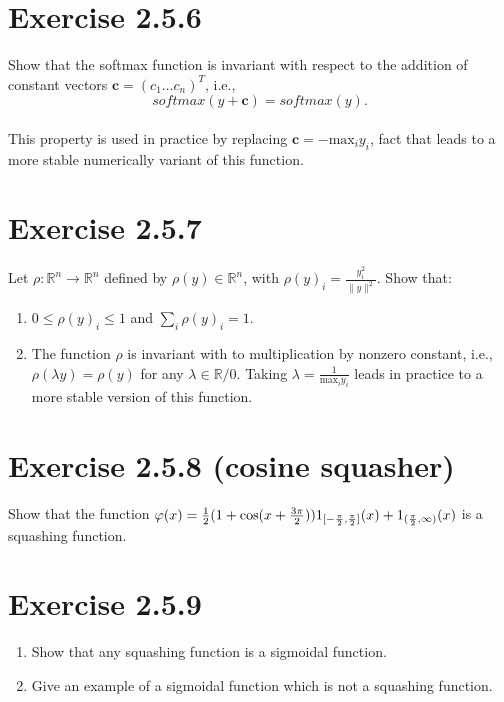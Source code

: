 \documentclass{exam}
\begin{document}
\section*{Exercise 2.5.6}
Show that the softmax function is invariant with respect to the addition of constant vectors $\pmb{c} = (c_1 \ldots c_n)^{T}$, i.e., \\
\begin{equation*}
    softmax(y + \pmb{c}) = softmax(y).
\end{equation*}\\
This property is used in practice by replacing $\pmb{c} = - \text{max}_i y_i$, fact that leads to a more stable numerically variant of this function.

\section*{Exercise 2.5.7}
Let $\rho: \mathbb{R}^n \rightarrow \mathbb{R}^n$ defined by $\rho(y) \in \mathbb{R}^n$, with $\rho(y)_i = \displaystyle\frac{y^2_i}{\lVert y \rVert^{2} }$. Show that: 
\begin{enumerate}
    \item $0 \leq \rho(y)_i \leq 1$ and $\sum_i \rho(y)_i = 1$.
    \item The function $\rho$ is invariant with to multiplication by nonzero constant, i.e., $\rho(\lambda y ) = \rho(y)$ for any $\lambda \in \mathbb{R}/{0}$. Taking $\lambda = \frac{1}{\text{max}_i y_i}$ leads in practice to a more stable version of this function. 
\end{enumerate}

\section*{Exercise 2.5.8 (cosine squasher)}
Show that the function $\varphi(x) = \frac{1}{2}(1 + \text{cos}(x + \frac{3\pi}{2}))1_{\tiny [-\frac{\pi}{2}, \frac{\pi}{2}]}(x) + 1_{\tiny (\frac{\pi}{2}, \infty)}(x)$ is a 
squashing function.

\section*{Exercise 2.5.9}
\begin{enumerate}
    \item Show that any squashing function is a sigmoidal function.
    \item Give an example of a sigmoidal function which is not a squashing function.
\end{enumerate}
\end{document}
